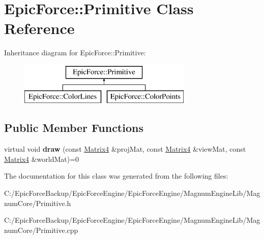 \hypertarget{class_epic_force_1_1_primitive}{}\section{Epic\+Force\+:\+:Primitive Class Reference}
\label{class_epic_force_1_1_primitive}
Inheritance diagram for Epic\+Force\+:\+:Primitive\+:\begin{figure}[H]
\begin{center}
\leavevmode
\includegraphics[height=2.000000cm]{class_epic_force_1_1_primitive}
\end{center}
\end{figure}
\subsection*{Public Member Functions}
\begin{DoxyCompactItemize}
\item 
virtual void {\bfseries draw} (const \hyperlink{class_magnum_1_1_matrix4}{Matrix4} \&proj\+Mat, const \hyperlink{class_magnum_1_1_matrix4}{Matrix4} \&view\+Mat, const \hyperlink{class_magnum_1_1_matrix4}{Matrix4} \&world\+Mat)=0\hypertarget{class_epic_force_1_1_primitive_a414baa373e6a25dbff1b82d3d16e4c3a}{}\label{class_epic_force_1_1_primitive_a414baa373e6a25dbff1b82d3d16e4c3a}

\end{DoxyCompactItemize}


The documentation for this class was generated from the following files\+:\begin{DoxyCompactItemize}
\item 
C\+:/\+Epic\+Force\+Backup/\+Epic\+Force\+Engine/\+Epic\+Force\+Engine/\+Magnum\+Engine\+Lib/\+Magnum\+Core/Primitive.\+h\item 
C\+:/\+Epic\+Force\+Backup/\+Epic\+Force\+Engine/\+Epic\+Force\+Engine/\+Magnum\+Engine\+Lib/\+Magnum\+Core/Primitive.\+cpp\end{DoxyCompactItemize}
